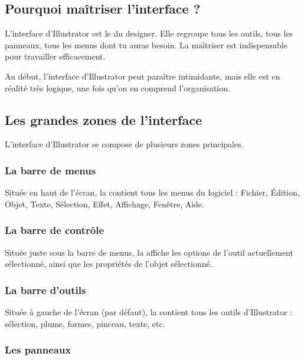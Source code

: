 \subsection{Pourquoi maîtriser l'interface ?}

L'interface d'Illustrator est le  du designer. Elle regroupe tous les outils, tous les panneaux, tous les menus dont tu auras besoin. La maîtriser est indispensable pour travailler efficacement.

Au début, l'interface d'Illustrator peut paraître intimidante, mais elle est en réalité très logique, une fois qu'on en comprend l'organisation.

\subsection{Les grandes zones de l'interface}

L'interface d'Illustrator se compose de plusieurs zones principales.

\subsubsection{La barre de menus}

Située en haut de l'écran, la  contient tous les menus du logiciel : Fichier, Édition, Objet, Texte, Sélection, Effet, Affichage, Fenêtre, Aide.

\subsubsection{La barre de contrôle}

Située juste sous la barre de menus, la  affiche les options de l'outil actuellement sélectionné, ainsi que les propriétés de l'objet sélectionné.

\subsubsection{La barre d'outils}

Située à gauche de l'écran (par défaut), la  contient tous les outils d'Illustrator : sélection, plume, formes, pinceau, texte, etc.

\subsubsection{Les panneaux}

